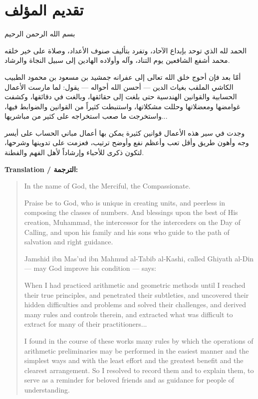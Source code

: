 \documentclass[11pt,a4paper]{book}
\newcommand{\ar}[1]{\arabicfont\beginR #1\endR}
\newcommand{\arHuge}[1]{{\Huge\arabicfont\beginR #1\endR}}
\newenvironment{arabicbox}{%
  \begin{framed}
  \begin{minipage}{\linewidth-2\fboxsep-2\fboxrule}
  \setlength{\parindent}{0pt}
  \linespread{1.3}\selectfont
}{%
  \end{minipage}
  \end{framed}
}
\begin{document}
\chapter*{\ar{تقديم المؤلف}}
\addcontentsline{toc}{chapter}{\ar{تقديم المؤلف}}

\begin{arabicbox}
\begin{center}
\arHuge{بسم الله الرحمن الرحيم}
\end{center}

\vspace{0.5cm}

\ar{الحمد لله الذي توحد بإبداع الآحاد، وتفرد بتأليف صنوف الأعداد، وصلاة على خير خلقه محمد أشفع الشافعين يوم التناد، وآله وأولاده الهادين إلى سبيل النجاة والرشاد.}

\vspace{0.5cm}

\ar{أمّا بعد فإن أحوج خلق الله تعالى إلى عفرانه جمشيد بن مسعود بن محمود الطبيب الكاشي الملقب بغياث الدين — أحسن الله أحواله — يقول: لما مارست الأعمال الحسابية والقوانين الهندسية حتى بلغت إلى حقائقها، وبالغت في دقائقها، وكشفت غوامضها ومعضلاتها وحللت مشكلاتها، واستنبطت كثيراً من القوانين والضوابط فيها، واستخرجت ما صعب استخراجه على كثير من مباشريها...}

\vspace{0.5cm}

\ar{وجدت في سير هذه الأعمال قوانين كثيرة يمكن بها أعمال مباني الحساب على أيسر وجه وأهون طريق وأقل تعب وأعظم نفع وأوضح ترتيب، فعزمت على تدوينها وشرحها، لتكون ذكرى للأحباء وإرشاداً لأهل الفهم والفطنة.}
\end{arabicbox}

\vspace{0.5cm}

\noindent\textbf{Translation / الترجمة:}

\begin{quote}
In the name of God, the Merciful, the Compassionate.

Praise be to God, who is unique in creating units, and peerless in composing the classes of numbers. And blessings upon the best of His creation, Muhammad, the intercessor for the interceders on the Day of Calling, and upon his family and his sons who guide to the path of salvation and right guidance.

Jamshid ibn Mas'ud ibn Mahmud al-Tabib al-Kashi, called Ghiyath al-Din --- may God improve his condition --- says:

When I had practiced arithmetic and geometric methods until I reached their true principles, and penetrated their subtleties, and uncovered their hidden difficulties and problems and solved their challenges, and derived many rules and controls therein, and extracted what was difficult to extract for many of their practitioners...

I found in the course of these works many rules by which the operations of arithmetic preliminaries may be performed in the easiest manner and the simplest ways and with the least effort and the greatest benefit and the clearest arrangement. So I resolved to record them and to explain them, to serve as a reminder for beloved friends and as guidance for people of understanding.
\end{quote}
\clearpage
\end{document}

